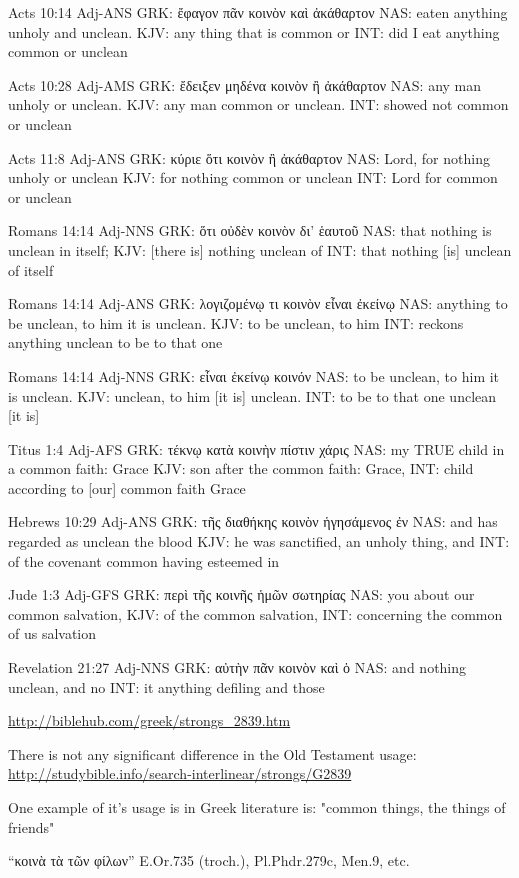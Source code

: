 \documentclass[11pt]{article}
\begin{document}
\begin{thebibliography}{37}
\begin{greek}
Acts 10:14 Adj-ANS
GRK: ἔφαγον πᾶν κοινὸν καὶ ἀκάθαρτον
NAS: eaten anything unholy and unclean.
KJV: any thing that is common or
INT: did I eat anything common or unclean

Acts 10:28 Adj-AMS
GRK: ἔδειξεν μηδένα κοινὸν ἢ ἀκάθαρτον
NAS: any man unholy or unclean.
KJV: any man common or unclean.
INT: showed not common or unclean

Acts 11:8 Adj-ANS
GRK: κύριε ὅτι κοινὸν ἢ ἀκάθαρτον
NAS: Lord, for nothing unholy or unclean
KJV: for nothing common or unclean
INT: Lord for common or unclean

Romans 14:14 Adj-NNS
GRK: ὅτι οὐδὲν κοινὸν δι' ἑαυτοῦ
NAS: that nothing is unclean in itself;
KJV: [there is] nothing unclean of
INT: that nothing [is] unclean of itself

Romans 14:14 Adj-ANS
GRK: λογιζομένῳ τι κοινὸν εἶναι ἐκείνῳ
NAS: anything to be unclean, to him it is unclean.
KJV: to be unclean, to him
INT: reckons anything unclean to be to that one

Romans 14:14 Adj-NNS
GRK: εἶναι ἐκείνῳ κοινόν 
NAS: to be unclean, to him it is unclean.
KJV: unclean, to him [it is] unclean.
INT: to be to that one unclean [it is]

Titus 1:4 Adj-AFS
GRK: τέκνῳ κατὰ κοινὴν πίστιν χάρις
NAS: my TRUE child in a common faith: Grace
KJV: son after the common faith: Grace,
INT: child according to [our] common faith Grace

Hebrews 10:29 Adj-ANS
GRK: τῆς διαθήκης κοινὸν ἡγησάμενος ἐν
NAS: and has regarded as unclean the blood
KJV: he was sanctified, an unholy thing, and
INT: of the covenant common having esteemed in

Jude 1:3 Adj-GFS
GRK: περὶ τῆς κοινῆς ἡμῶν σωτηρίας
NAS: you about our common salvation,
KJV: of the common salvation,
INT: concerning the common of us salvation

Revelation 21:27 Adj-NNS
GRK: αὐτὴν πᾶν κοινὸν καὶ ὁ
NAS: and nothing unclean, and no
INT: it anything defiling and those
\end{greek}
\url{http://biblehub.com/greek/strongs_2839.htm}

There is not any significant difference in the Old Testament usage:
\url{http://studybible.info/search-interlinear/strongs/G2839}


One example of it's usage is in Greek literature is:
"common things, the things of friends"
\begin{greek}
“κοινὰ τὰ τῶν φίλων” E.Or.735 (troch.), Pl.Phdr.279c, Men.9, etc.


\end{greek}
\end{thebibliography}
\end{document}
